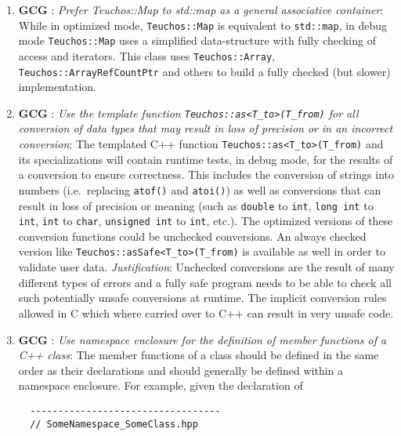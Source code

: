 \begin{enumerate}
{}\item{}\textbf{GCG }:
{}\textit{Prefer Teuchos::Map to std::map as a general associative
container}: While in optimized mode, {}\texttt{Teuchos\-::Map} is equivalent
to {}\texttt{std\-::map}, in debug mode {}\texttt{Teuchos\-::Map} uses a
simplified data-structure with fully checking of access and iterators.  This
class uses {}\texttt{Teuchos\-::Array},
{}\texttt{Teuchos\-::Array\-Ref\-Count\-Ptr} and others to build a fully
checked (but slower) implementation.

{}\item{}\textbf{GCG }:
{}\textit{Use the template function
{}\texttt{Teuchos::as<T\_to>(T\_from)} for all conversion of data types that
may result in loss of precision or in an incorrect conversion}: The templated
C++ function {}\texttt{Teuchos::as<T\_to>(T\_from)} and its specializations
will contain runtime tests, in debug mode, for the results of a conversion to
ensure correctness.  This includes the conversion of strings into numbers
(i.e.\ replacing {}\texttt{atof()} and {}\texttt{atoi()}) as well as
conversions that can result in loss of precision or meaning (such as
{}\texttt{double} to {}\texttt{int}, {}\texttt{long int} to {}\texttt{int},
{}\texttt{int} to {}\texttt{char}, {}\texttt{unsigned int} to {}\texttt{int},
etc.).  The optimized versions of these conversion functions could be
unchecked conversions.  An always checked version like
{}\texttt{Teuchos\-::asSafe\-<\-T\_to\->\-(\-T\_from\-)} is available as well
in order to validate user data.  {}\textit{Justification}: Unchecked
conversions are the result of many different types of errors and a fully safe
program needs to be able to check all such potentially unsafe conversions at
runtime.  The implicit conversion rules allowed in C which where carried over
to C++ can result in very unsafe code.

{}\item{}\textbf{GCG }:
{}\textit{Use namespace enclosure for the definition of member functions
of a C++ class}: The member functions of a class should be defined in the same
order as their declarations and should generally be defined within a namespace
enclosure.  For example, given the declaration of

{\small\begin{verbatim}
  ----------------------------------
  // SomeNamespace_SomeClass.hpp


\end{verbatim}}
\end{enumerate}
